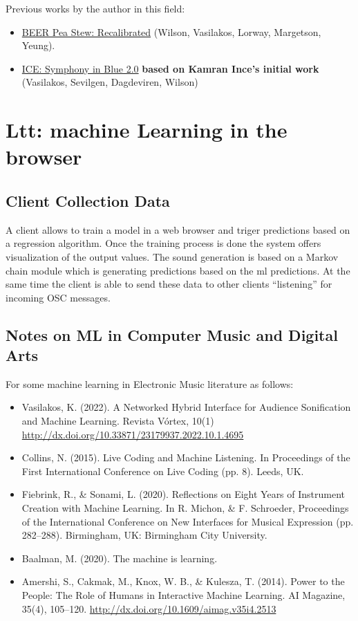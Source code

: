 \documentclass[11pt]{article}
\begin{document}
Previous works by the author in this field:
\begin{itemize}
\item \href{https://serkansevilgen.com/docs/01\_ICLC\_2021\_Sevilgen\_Vasilakos\_Wilson.pdf}{BEER Pea Stew: Recalibrated} (Wilson, Vasilakos, Lorway, Margetson, Yeung).
\item \href{https://serkansevilgen.com/docs/01\_ICLC\_2021\_Sevilgen\_Vasilakos\_Wilson.pdf}{ICE: Symphony in Blue 2.0} \textbf{based on Kamran Ince's initial work} (Vasilakos, Sevilgen, Dagdeviren, Wilson)
\end{itemize}

\section*{Ltt: machine Learning in the browser}
\label{sec:orga8d0465}
\subsection*{Client Collection Data}
\label{sec:org006e1b7}
A client allows to train a model in a web browser and triger predictions based on a regression algorithm. Once the training process is done the system offers visualization of the output values. The sound generation is based on a Markov chain module which is generating predictions based on the ml predictions. At the same time the client is able to send these data to other clients ``listening''  for incoming OSC messages.
\subsection*{Notes on ML in Computer Music and Digital Arts}
\label{sec:org1672f84}
For some machine learning in Electronic Music literature as follows:
\begin{itemize}
\item Vasilakos, K. (2022). A Networked Hybrid Interface for Audience Sonification and Machine Learning. Revista Vórtex, 10(1) \url{http://dx.doi.org/10.33871/23179937.2022.10.1.4695}
\item Collins, N. (2015). Live Coding and Machine Listening. In Proceedings of the First International Conference on Live Coding (pp. 8). Leeds, UK.
\item Fiebrink, R., \& Sonami, L. (2020). Reflections on Eight Years of Instrument Creation with Machine Learning. In R. Michon, \& F. Schroeder, Proceedings of the International Conference on New Interfaces for Musical Expression (pp. 282–288). Birmingham, UK: Birmingham City University.
\item Baalman, M. (2020). The machine is learning.
\item Amershi, S., Cakmak, M., Knox, W. B., \& Kulesza, T. (2014). Power to the People: The Role of Humans in Interactive Machine Learning. AI Magazine, 35(4), 105–120. \url{http://dx.doi.org/10.1609/aimag.v35i4.2513}
\end{itemize}
\end{document}
